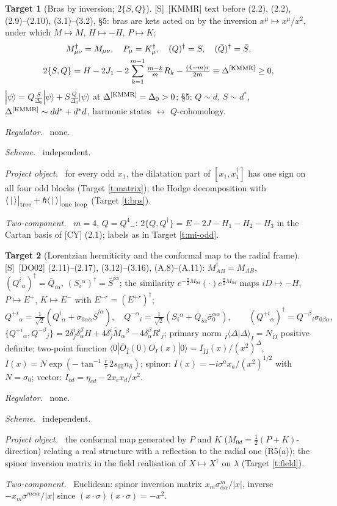 \documentclass[11pt]{article}
\theoremstyle{definition}
\newtheorem{target}{Target}
\newcommand{\Sl}{\textup{[S]}}
\newcommand{\tree}{\big|_{\rm tree}}
\newcommand{\oneloop}{\big|_{\rm one\ loop}}
\newcommand{\fld}[1]{\par\textit{#1.}\ }
\begin{document}
\begin{target}[Bras by inversion; $2\{S,Q\}$]\label{t:kmmr}
\Sl\ [KMMR] text before (2.2), (2.2), (2.9)--(2.10), (3.1)--(3.2), \S5: bras are kets acted on by the inversion $x^\mu\mapsto x^\mu/x^2$, under which $M\mapsto M$, $H\mapsto-H$, $P\mapsto K$;
\[
\begin{gathered}
M_{\mu\nu}^\dagger=M_{\mu\nu},\quad P_\mu=K_\mu^\dagger,\quad (Q)^\dagger=S,\quad(\bar Q)^\dagger=\bar S,\\
2\{S,Q\}=H-2J_1-2\sum_{k=1}^{m-1}\tfrac{m-k}m R_k-\tfrac{(4-m)r}{2m}\equiv\Delta^{\rm[KMMR]}\ge0,
\end{gathered}
\]
$|\psi\rangle=Q\frac S{\Delta_0}|\psi\rangle+S\frac Q{\Delta_0}|\psi\rangle$ at $\Delta^{\rm[KMMR]}=\Delta_0>0$; \S5: $Q\sim d$, $S\sim d^*$, $\Delta^{\rm[KMMR]}\sim dd^*+d^*d$, harmonic states $\leftrightarrow$ $Q$-cohomology.
\fld{Regulator} none. \fld{Scheme} independent.
\fld{Project object} for every odd $x_1$, the dilatation part of $[x_1,x_1^\dagger]$ has one sign on all four odd blocks (Target \ref{t:matrix}); the Hodge decomposition with $\langle\,|\,\rangle\tree+\hbar\langle\,|\,\rangle\oneloop$ (Target \ref{t:bps}).
\fld{Two-component} $m=4$, $Q=Q^4{}_-$: $2\{Q,Q^\dagger\}=E-2J-H_1-H_2-H_3$ in the Cartan basis of [CY] (2.1); labels as in Target \ref{t:mi-odd}.
\end{target}

\begin{target}[Lorentzian hermiticity and the conformal map to the radial frame]\label{t:do}
\Sl\ [DO02] (2.11)--(2.17), (3.12)--(3.16), (A.8)--(A.11): $M_{AB}^\dagger=M_{AB}$, $(Q^i{}_\alpha)^\dagger=\bar Q_{i\dot\alpha}$, $(S_i{}^\alpha)^\dagger=\bar S^{i\dot\alpha}$; the similarity $e^{-\frac\pi2M_{0d}}(\cdot)e^{\frac\pi2M_{0d}}$ maps $iD\mapsto-H$, $P\mapsto E^+$, $K\mapsto E^-$ with $E^{-r}=(E^{+r})^\dagger$;
\[
Q^{+i}{}_\alpha=\tfrac1{\sqrt2}(Q^i{}_\alpha+\sigma_{0\alpha\dot\alpha}\bar S^{i\dot\alpha}),\quad Q^{-\alpha}{}_i=\tfrac1{\sqrt2}(S_i{}^\alpha+\bar Q_{i\dot\alpha}\bar\sigma_0^{\dot\alpha\alpha}),\qquad (Q^{+i}{}_\alpha)^\dagger=Q^{-\beta}{}_i\sigma_{0\beta\dot\alpha},
\]
$\{Q^{+i}{}_\alpha,Q^{-\beta}{}_j\}=2\delta^i_j\delta^\beta_\alpha H+4\delta^i_j\tilde M_\alpha{}^\beta-4\delta_\alpha^\beta R^i{}_j$; primary norm ${}_{\bar I}\langle\Delta|\Delta\rangle_I=N_{\bar II}$ positive definite; two-point function $\langle0|\bar O_{\bar I}(0)O_I(x)|0\rangle=I_{\bar II}(x)/(x^2)^\Delta$, $I(x)=N\exp(-\tan^{-1}\tfrac r\tau\,2s_{0\hat a}n_{\hat a})$; spinor: $I(x)=-i\sigma^ax_a/(x^2)^{1/2}$ with $N=\sigma_0$; vector: $I_{cd}=\eta_{cd}-2x_cx_d/x^2$.
\fld{Regulator} none. \fld{Scheme} independent.
\fld{Project object} the conformal map generated by $P$ and $K$ ($M_{0d}=\tfrac12(P+K)$-direction) relating a real structure with a reflection to the radial one (R5(a)); the spinor inversion matrix in the field realisation of $X\mapsto X^\dagger$ on $\lambda$ (Target \ref{t:field}).
\fld{Two-component} Euclidean: spinor inversion matrix $x_m\sigma^m_{\alpha\dot\alpha}/|x|$, inverse $-x_m\bar\sigma^{m\dot\alpha\alpha}/|x|$ since $(x\cdot\sigma)(x\cdot\bar\sigma)=-x^2$.
\end{target}
\end{document}
